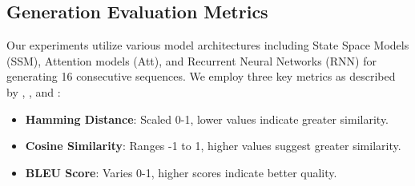 \documentclass[10pt,a4paper]{article}
\begin{document}
\subsection{Generation Evaluation Metrics}

Our experiments utilize various model architectures including State Space Models (SSM), Attention models (Att), and Recurrent Neural Networks (RNN) for generating 16 consecutive sequences. We employ three key metrics as described by \cite{sutskever2014sequence}, \cite{hamming1950error}, and \cite{papineni2002bleu}:

\begin{itemize}
    \item \textbf{Hamming Distance}: Scaled 0-1, lower values indicate greater similarity.
    \item \textbf{Cosine Similarity}: Ranges -1 to 1, higher values suggest greater similarity.
    \item \textbf{BLEU Score}: Varies 0-1, higher scores indicate better quality.
\end{itemize}
\end{document}
